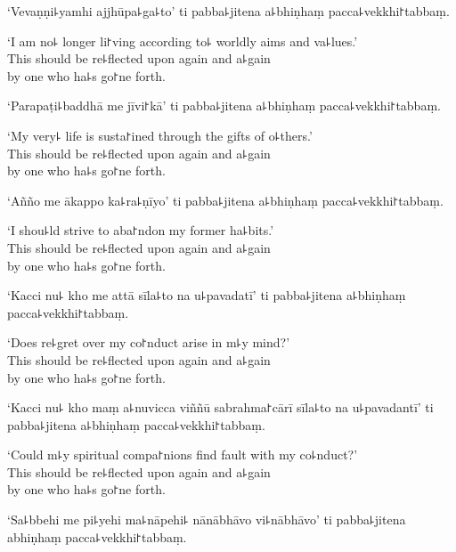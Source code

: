 `Vevaṇṇi꜕yamhi ajjhūpa꜕ga꜕to' ti pabba꜕jitena a꜕bhiṇhaṃ pacca꜕vekkhi꜓tabbaṃ.

\begin{english}
  `I am no꜕ longer li꜓ving according to꜕ worldly aims and va꜕lues.'\\
  This should be re꜕flected upon again and a꜕gain\\
  by one who ha꜕s go꜓ne forth.
\end{english}

`Parapaṭi꜕baddhā me jīvi꜓kā' ti pabba꜕jitena a꜕bhiṇhaṃ pacca꜕vekkhi꜓tabbaṃ.

\begin{english}
  `My very꜕ life is susta꜓ined through the gifts of o꜕thers.'\\
  This should be re꜕flected upon again and a꜕gain\\
  by one who ha꜕s go꜓ne forth.
\end{english}

`Añño me ākappo ka꜕ra꜕ṇīyo' ti pabba꜕jitena a꜕bhiṇhaṃ pacca꜕vekkhi꜓tabbaṃ.

\begin{english}
  `I shou꜕ld strive to aba꜓ndon my former ha꜕bits.'\\
  This should be re꜕flected upon again and a꜕gain\\
  by one who ha꜕s go꜓ne forth.
\end{english}

\clearpage

`Kacci nu꜕ kho me attā sīla꜕to na u꜕pavadatī' ti pabba꜕jitena a꜕bhiṇhaṃ pacca꜕vekkhi꜓tabbaṃ.

\begin{english}
  `Does re꜕gret over my co꜓nduct arise in m꜕y mind?'\\
  This should be re꜕flected upon again and a꜕gain\\
  by one who ha꜕s go꜓ne forth.
\end{english}

`Kacci nu꜕ kho maṃ a꜕nuvicca viññū sabrahma꜓cārī sīla꜕to na u꜕pavadantī' ti pabba꜕jitena a꜕bhiṇhaṃ pacca꜕vekkhi꜓tabbaṃ.

\begin{english}
  `Could m꜕y spiritual compa꜓nions find fault with my co꜕nduct?'\\
  This should be re꜕flected upon again and a꜕gain\\
  by one who ha꜕s go꜓ne forth.
\end{english}

`Sa꜕bbehi me pi꜕yehi ma꜕nāpehi꜕ nānābhāvo vi꜕nābhāvo' ti pabba꜕jitena abhiṇhaṃ pacca꜕vekkhi꜓tabbaṃ.

